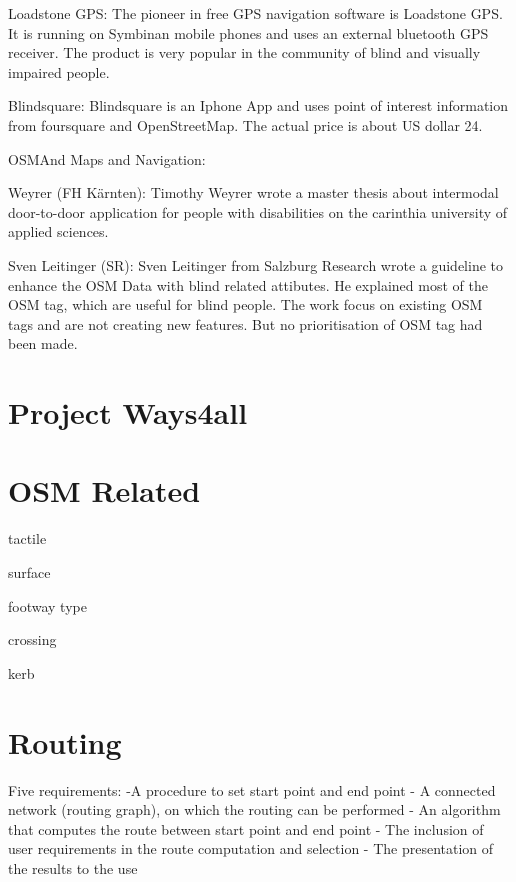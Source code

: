 \documentclass{sig-alternate}
\begin{document}
Loadstone GPS:
The pioneer in free GPS navigation software is Loadstone GPS\cite{loadstone}. It is running on Symbinan mobile phones and uses an external bluetooth GPS receiver. The product is very popular in the community of blind and visually impaired people.

Blindsquare:
Blindsquare\cite{blindsquare} is an Iphone App and uses point of interest information from foursquare and OpenStreetMap. The actual price is about US dollar 24. 

OSMAnd Maps and Navigation:

Weyrer (FH K\"{a}rnten): 
Timothy Weyrer\cite{weyrer} wrote a master thesis about intermodal door-to-door application for people with disabilities on the carinthia university of applied sciences.

Sven Leitinger (SR):
Sven Leitinger\cite{sven:osm} from Salzburg Research wrote a guideline to enhance the OSM Data with blind related attibutes. He explained most of the OSM tag, which are useful for blind people. The work focus on existing OSM tags and are not creating new features. But no prioritisation of OSM tag had been made. 

\section{Project Ways4all}


\section{OSM Related}
\begin{description}
  \item tactile
  \item surface
  \item footway type
  \item crossing
  \item kerb
\end{description}

\section{Routing}
Five requirements:
-A procedure to set start point and end point
- A connected network (routing graph), on which the routing can be performed
- An algorithm that computes the route between start point and end point
- The inclusion of user requirements in the route computation and selection
- The presentation of the results to the use
\end{document}
